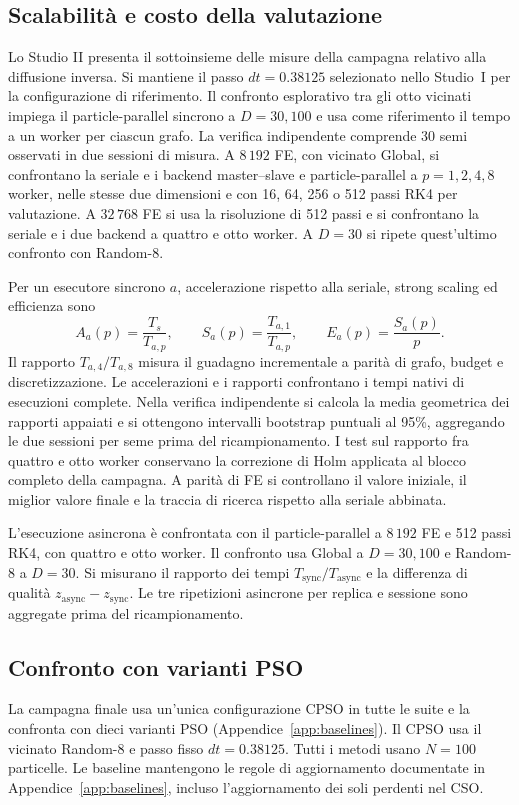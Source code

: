 \subsection{Scalabilità e costo della valutazione}\label{subsec:exp-parallel}
Lo Studio II presenta il sottoinsieme delle misure della campagna relativo alla diffusione inversa. Si mantiene il passo $dt=0.38125$ selezionato nello Studio~I per la configurazione di riferimento. Il confronto esplorativo tra gli otto vicinati impiega il particle-parallel sincrono a $D=30,100$ e usa come riferimento il tempo a un worker per ciascun grafo. La verifica indipendente comprende 30 semi osservati in due sessioni di misura. A $8\,192$ FE, con vicinato Global, si confrontano la seriale e i backend master--slave e particle-parallel a $p=1,2,4,8$ worker, nelle stesse due dimensioni e con 16, 64, 256 o 512 passi RK4 per valutazione. A $32\,768$ FE si usa la risoluzione di 512 passi e si confrontano la seriale e i due backend a quattro e otto worker. A $D=30$ si ripete quest'ultimo confronto con Random-8.

Per un esecutore sincrono $a$, accelerazione rispetto alla seriale, strong scaling ed efficienza sono
\begin{equation}
 A_a(p)=\frac{T_s}{T_{a,p}},\qquad
 S_a(p)=\frac{T_{a,1}}{T_{a,p}},\qquad E_a(p)=\frac{S_a(p)}p.
 \label{eq:speedup-efficiency}
\end{equation}
Il rapporto $T_{a,4}/T_{a,8}$ misura il guadagno incrementale a parità di grafo, budget e discretizzazione. Le accelerazioni e i rapporti confrontano i tempi nativi di esecuzioni complete. Nella verifica indipendente si calcola la media geometrica dei rapporti appaiati e si ottengono intervalli bootstrap puntuali al 95\%, aggregando le due sessioni per seme prima del ricampionamento. I test sul rapporto fra quattro e otto worker conservano la correzione di Holm applicata al blocco completo della campagna. A parità di FE si controllano il valore iniziale, il miglior valore finale e la traccia di ricerca rispetto alla seriale abbinata.

L'esecuzione asincrona è confrontata con il particle-parallel a $8\,192$ FE e 512 passi RK4, con quattro e otto worker. Il confronto usa Global a $D=30,100$ e Random-8 a $D=30$. Si misurano il rapporto dei tempi $T_{\mathrm{sync}}/T_{\mathrm{async}}$ e la differenza di qualità $z_{\mathrm{async}}-z_{\mathrm{sync}}$. Le tre ripetizioni asincrone per replica e sessione sono aggregate prima del ricampionamento.

\subsection{Confronto con varianti PSO}\label{subsec:exp-pso}
\begingroup\color{RevisionBlue}
La campagna finale usa un'unica configurazione CPSO in tutte le suite e la confronta con dieci varianti PSO (Appendice~\ref{app:baselines}). Il CPSO usa il vicinato Random-8 e passo fisso $dt=0.38125$. Tutti i metodi usano $N=100$ particelle. Le baseline mantengono le regole di aggiornamento documentate in Appendice~\ref{app:baselines}, incluso l'aggiornamento dei soli perdenti nel CSO.

